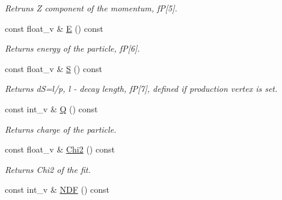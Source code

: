 \begin{DoxyCompactItemize}
\begin{DoxyCompactList}\small\item\em Retruns Z component of the momentum, fP\mbox{[}5\mbox{]}. \end{DoxyCompactList}\item 
const float\+\_\+v \& \hyperlink{classKFParticleBaseSIMD_a4bd7f392f848910230c1c0bd8daf3d65}{E} () const \hypertarget{classKFParticleBaseSIMD_a4bd7f392f848910230c1c0bd8daf3d65}{}\label{classKFParticleBaseSIMD_a4bd7f392f848910230c1c0bd8daf3d65}

\begin{DoxyCompactList}\small\item\em Returns energy of the particle, fP\mbox{[}6\mbox{]}. \end{DoxyCompactList}\item 
const float\+\_\+v \& \hyperlink{classKFParticleBaseSIMD_a906019dfd64d4209f9734506b195f9ed}{S} () const \hypertarget{classKFParticleBaseSIMD_a906019dfd64d4209f9734506b195f9ed}{}\label{classKFParticleBaseSIMD_a906019dfd64d4209f9734506b195f9ed}

\begin{DoxyCompactList}\small\item\em Returns dS=l/p, l -\/ decay length, fP\mbox{[}7\mbox{]}, defined if production vertex is set. \end{DoxyCompactList}\item 
const int\+\_\+v \& \hyperlink{classKFParticleBaseSIMD_a4627da237cb56fc359e983cf697741c0}{Q} () const \hypertarget{classKFParticleBaseSIMD_a4627da237cb56fc359e983cf697741c0}{}\label{classKFParticleBaseSIMD_a4627da237cb56fc359e983cf697741c0}

\begin{DoxyCompactList}\small\item\em Returns charge of the particle. \end{DoxyCompactList}\item 
const float\+\_\+v \& \hyperlink{classKFParticleBaseSIMD_a54e2c6e7835e73172da85839ca2c4753}{Chi2} () const \hypertarget{classKFParticleBaseSIMD_a54e2c6e7835e73172da85839ca2c4753}{}\label{classKFParticleBaseSIMD_a54e2c6e7835e73172da85839ca2c4753}

\begin{DoxyCompactList}\small\item\em Returns Chi2 of the fit. \end{DoxyCompactList}\item 
const int\+\_\+v \& \hyperlink{classKFParticleBaseSIMD_a52b5ff420b0fe125c2b53651565d5e28}{N\+DF} () const \hypertarget{classKFParticleBaseSIMD_a52b5ff420b0fe125c2b53651565d5e28}{}\label{classKFParticleBaseSIMD_a52b5ff420b0fe125c2b53651565d5e28}


\end{DoxyCompactItemize}
